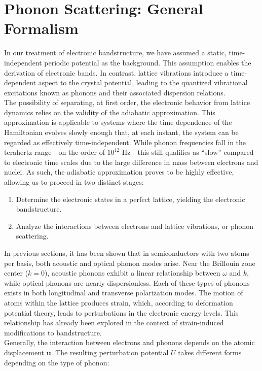 \section{Phonon Scattering: General Formalism}
In our treatment of electronic bandstructure, we have assumed a static, time-independent periodic potential as the background. This assumption enables the derivation of electronic bands. In contrast, lattice vibrations introduce a time-dependent aspect to the crystal potential, leading to the quantized vibrational excitations known as phonons and their associated dispersion relations.\\
The possibility of separating, at first order, the electronic behavior from lattice dynamics relies on the validity of the adiabatic approximation. This approximation is applicable to systems where the time dependence of the Hamiltonian evolves slowly enough that, at each instant, the system can be regarded as effectively time-independent. While phonon frequencies fall in the terahertz range—on the order of $10^{12}$ Hz—this still qualifies as “slow” compared to electronic time scales due to the large difference in mass between electrons and nuclei. As such, the adiabatic approximation proves to be highly effective, allowing us to proceed in two distinct stages:
\begin{enumerate}
	\item Determine the electronic states in a perfect lattice, yielding the electronic bandstructure.
	\item Analyze the interactions between electrons and lattice vibrations, or phonon scattering.
\end{enumerate}
In previous sections, it has been shown that in semiconductors with two atoms per basis, both acoustic and optical phonon modes arise. Near the Brillouin zone center ($k = 0$), acoustic phonons exhibit a linear relationship between $\omega$ and $k$, while optical phonons are nearly dispersionless. Each of these types of phonons exists in both longitudinal and transverse polarization modes. The motion of atoms within the lattice produces strain, which, according to deformation potential theory, leads to perturbations in the electronic energy levels. This relationship has already been explored in the context of strain-induced modifications to bandstructure.\\
Generally, the interaction between electrons and phonons depends on the atomic displacement $\mathbf{u}$. The resulting perturbation potential $U$ takes different forms depending on the type of phonon:
